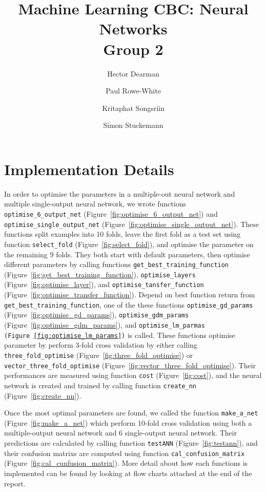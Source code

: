 \documentclass[10pt,a4paper]{article}
\author{Hector Dearman \and Paul Rowe-White \and Kritaphat Songsriin \and Simon Stuckemann}
\title{Machine Learning CBC: Neural Networks\\Group 2}
\begin{document}
\maketitle

\section{Implementation Details}

In order to optimise the parameters in a multiple-out neural network and multiple single-output neural network, we wrote functions {\tt optimise\_6\_output\_net} (Figure~\ref{fig:optimise_6_output_net}) and {\tt optimise\_single\_output\_net} (Figure~\ref{fig:optimise_single_output_net}). These functions split examples into 10 folds, leave the first fold as a test set using function {\tt select\_fold} (Figure~\ref{fig:select_fold}), and optimise the parameter on the remaining 9 folds. They both start with default parameters, then optimise different parameters by calling functions {\tt get\_best\_training\_function} (Figure~\ref{fig:get_best_training_function}), {\tt optimise\_layers} (Figure~\ref{fig:optimise_layer}), and {\tt optimise\_tansfer\_function} (Figure~\ref{fig:optimise_transfer_function}). Depend on best function return from {\tt get\_best\_training\_function}, one of the these functions {\tt optimise\_gd\_params} (Figure~\ref{fig:optimise_gd_params}), {\tt optimise\_gdm\_params} (Figure~\ref{fig:optimise_gdm_params}), and {\tt optimise\_lm\_parmas (Figure~\ref{fig:optimise_lm_params})} is called. These functions optimise parameter by perform 3-fold cross validation by either calling {\tt three\_fold\_optimise} (Figure~\ref{fig:three_fold_optimise}) or {\tt vector\_three\_fold\_optimise} (Figure~\ref{fig:vector_three_fold_optimise}). Their performances are measured using function {\tt cost} (Figure~\ref{fig:cost}), and the neural network is created and trained by calling function {\tt create\_nn} (Figure~\ref{fig:create_nn}).

Once the most optimal parameters are found, we called the function {\tt make\_a\_net} (Figure~\ref{fig:make_a_net}) which perform 10-fold cross validation using both a multiple-output neural network and 6 single-output neural network. Their predictions are calculated by calling function {\tt testANN} (Figure~\ref{fig:testann}), and their confusion matrixs are computed using function {\tt cal\_confusion\_matrix} (Figure~\ref{fig:cal_cunfusion_matrix}). More detail about how each functions is implemented can be found by looking at flow charts attached at the end of the report.
\end{document}
